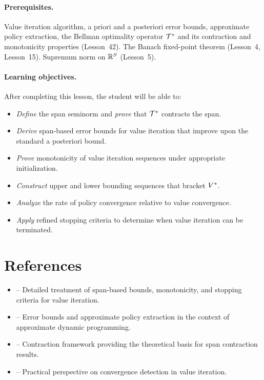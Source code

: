 \documentclass[11pt,a4paper]{article}
\begin{document}
\paragraph{Prerequisites.}
Value iteration algorithm, a priori and a posteriori error bounds,
approximate policy extraction, the Bellman optimality operator
$\mathcal{T}^*$ and its contraction and monotonicity properties
(Lesson~42). The Banach fixed-point theorem (Lesson~4, Lesson~15).
Supremum norm on $\mathbb{R}^S$ (Lesson~5).

\paragraph{Learning objectives.}
After completing this lesson, the student will be able to:
\begin{itemize}
    \item \emph{Define} the span seminorm and \emph{prove} that
    $\mathcal{T}^*$ contracts the span.
    \item \emph{Derive} span-based error bounds for value iteration
    that improve upon the standard a posteriori bound.
    \item \emph{Prove} monotonicity of value iteration sequences
    under appropriate initialization.
    \item \emph{Construct} upper and lower bounding sequences that
    bracket $V^*$.
    \item \emph{Analyze} the rate of policy convergence relative to
    value convergence.
    \item \emph{Apply} refined stopping criteria to determine when
    value iteration can be terminated.
\end{itemize}


\section{References}
\label{sec:references}

\begin{itemize}
    \item \citet[Chapter 6, Sections 6.3--6.6]{puterman2014} --
    Detailed treatment of span-based bounds, monotonicity, and
    stopping criteria for value iteration.
    \item \citet[Chapter 1]{bertsekas2012} -- Error bounds and
    approximate policy extraction in the context of approximate
    dynamic programming.
    \item \citet{denardo1967} -- Contraction framework providing the
    theoretical basis for span contraction results.
    \item \citet{suttonbarto2018} -- Practical perspective on
    convergence detection in value iteration.
\end{itemize}
\end{document}
